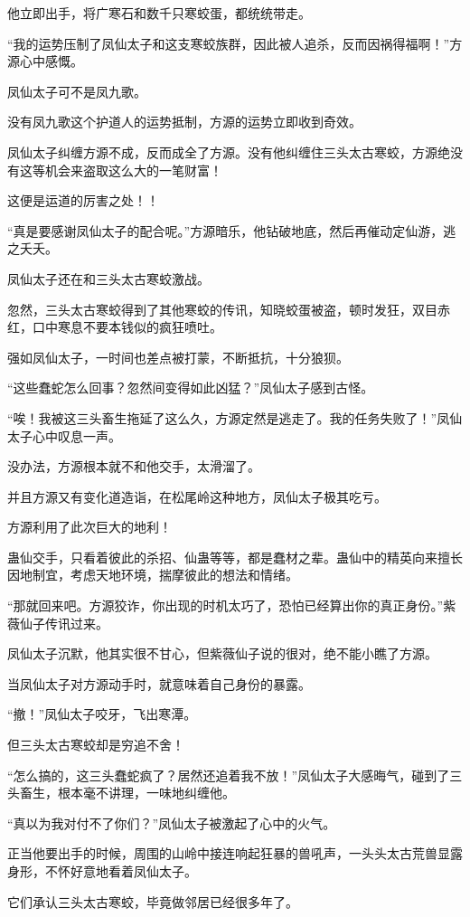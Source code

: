 \begin{this_body}
他立即出手，将广寒石和数千只寒蛟蛋，都统统带走。

“我的运势压制了凤仙太子和这支寒蛟族群，因此被人追杀，反而因祸得福啊！”方源心中感慨。

凤仙太子可不是凤九歌。

没有凤九歌这个护道人的运势抵制，方源的运势立即收到奇效。

凤仙太子纠缠方源不成，反而成全了方源。没有他纠缠住三头太古寒蛟，方源绝没有这等机会来盗取这么大的一笔财富！

这便是运道的厉害之处！！

“真是要感谢凤仙太子的配合呢。”方源暗乐，他钻破地底，然后再催动定仙游，逃之夭夭。

凤仙太子还在和三头太古寒蛟激战。

忽然，三头太古寒蛟得到了其他寒蛟的传讯，知晓蛟蛋被盗，顿时发狂，双目赤红，口中寒息不要本钱似的疯狂喷吐。

强如凤仙太子，一时间也差点被打蒙，不断抵抗，十分狼狈。

“这些蠢蛇怎么回事？忽然间变得如此凶猛？”凤仙太子感到古怪。

“唉！我被这三头畜生拖延了这么久，方源定然是逃走了。我的任务失败了！”凤仙太子心中叹息一声。

没办法，方源根本就不和他交手，太滑溜了。

并且方源又有变化道造诣，在松尾岭这种地方，凤仙太子极其吃亏。

方源利用了此次巨大的地利！

蛊仙交手，只看着彼此的杀招、仙蛊等等，都是蠢材之辈。蛊仙中的精英向来擅长因地制宜，考虑天地环境，揣摩彼此的想法和情绪。

“那就回来吧。方源狡诈，你出现的时机太巧了，恐怕已经算出你的真正身份。”紫薇仙子传讯过来。

凤仙太子沉默，他其实很不甘心，但紫薇仙子说的很对，绝不能小瞧了方源。

当凤仙太子对方源动手时，就意味着自己身份的暴露。

“撤！”凤仙太子咬牙，飞出寒潭。

但三头太古寒蛟却是穷追不舍！

“怎么搞的，这三头蠢蛇疯了？居然还追着我不放！”凤仙太子大感晦气，碰到了三头畜生，根本毫不讲理，一味地纠缠他。

“真以为我对付不了你们？”凤仙太子被激起了心中的火气。

正当他要出手的时候，周围的山岭中接连响起狂暴的兽吼声，一头头太古荒兽显露身形，不怀好意地看着凤仙太子。

它们承认三头太古寒蛟，毕竟做邻居已经很多年了。


\end{this_body}
